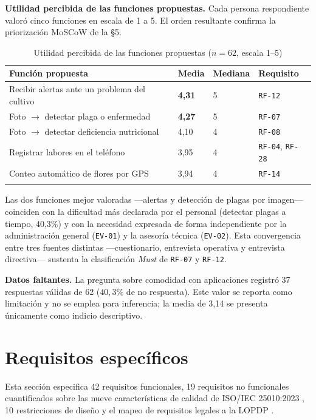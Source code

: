 \documentclass[11pt,a4paper]{article}
\newcommand{\id}[1]{\texttt{\begingroup\hyphenpenalty=10000\relax#1\endgroup}}
\renewcommand{\id}[1]{\texttt{#1}}
\begin{document}
\textbf{Utilidad percibida de las funciones propuestas.} Cada persona respondiente valoró cinco
funciones en escala de 1 a 5. El orden resultante confirma la priorización MoSCoW de la §5.

\begin{longtable}{|L{7.6cm}|C{1.8cm}|C{1.8cm}|C{2.6cm}|}
\hline
{}\textbf{Función propuesta} & \textbf{Media} & \textbf{Mediana} & \textbf{Requisito} \\
\hline
\endhead
Recibir alertas ante un problema del cultivo & \textbf{4{,}31} & 5 & \id{RF-12} \\ \hline
Foto $\rightarrow$ detectar plaga o enfermedad & \textbf{4{,}27} & 5 & \id{RF-07} \\ \hline
Foto $\rightarrow$ detectar deficiencia nutricional & 4{,}10 & 4 & \id{RF-08} \\ \hline
Registrar labores en el teléfono & 3{,}95 & 4 & \id{RF-04}, \id{RF-28} \\ \hline
Conteo automático de flores por GPS & 3{,}94 & 4 & \id{RF-14} \\ \hline
\caption{Utilidad percibida de las funciones propuestas ($n=62$, escala 1--5)}
\end{longtable}

\noindent
Las dos funciones mejor valoradas ---alertas y detección de plagas por imagen--- coinciden con la
dificultad más declarada por el personal (detectar plagas a tiempo, 40{,}3\%) y con la necesidad
expresada de forma independiente por la administración general (\id{EV-01}) y la asesoría técnica
(\id{EV-02}). Esta convergencia entre tres fuentes distintas ---cuestionario, entrevista operativa y
entrevista directiva--- sustenta la clasificación \emph{Must} de \id{RF-07} y \id{RF-12}.

\textbf{Datos faltantes.} La pregunta sobre comodidad con aplicaciones registró 37 respuestas
válidas de 62 ($40{,}3\%$ de no respuesta). Este valor se reporta como limitación y no se emplea
para inferencia; la media de 3{,}14 se presenta únicamente como indicio descriptivo.

\newpage
\section{Requisitos específicos}

Esta sección especifica 42 requisitos funcionales, 19 requisitos no funcionales cuantificados sobre
las nueve características de calidad de ISO/IEC 25010:2023 \cite{iso25010}, 10 restricciones de
diseño y el mapeo de requisitos legales a la LOPDP \cite{lopdp}.
\end{document}
